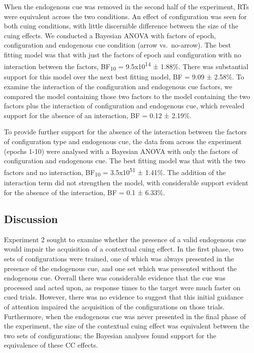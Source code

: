 \documentclass[
  man,floatsintext]{apa7}
\begin{document}
When the endogenous cue was removed in the second half of the experiment, RTs were equivalent across the two conditions. An effect of configuration was seen for both cuing conditions, with little discernible difference between the size of the cuing effects. We conducted a Bayesian ANOVA with factors of epoch, configuration and endogenous cue condition (arrow vs.~no-arrow). The best fitting model was that with just the factors of epoch and configuration with no interaction between the factors, BF\textsubscript{10} = 9.5x10\textsuperscript{14} ± 1.88\%. There was substantial support for this model over the next best fitting model, BF = 9.09 ± 2.58\%. To examine the interaction of the configuration and endogenous cue factors, we compared the model containing those two factors to the model containing the two factors plus the interaction of configuration and endogenous cue, which revealed support for the absence of an interaction, BF = 0.12 ± 2.19\%.

To provide further support for the absence of the interaction between the factors of configuration type and endogenous cue, the data from across the experiment (epochs 1-10) were analysed with a Bayesian ANOVA with only the factors of configuration and endogenous cue. The best fitting model was that with the two factors and no interaction, BF\textsubscript{10} = 3.5x10\textsuperscript{51} ± 1.41\%. The addition of the interaction term did not strengthen the model, with considerable support evident for the absence of the interaction, BF = 0.1 ± 6.33\%.

\hypertarget{discussion-1}{%
\subsection{Discussion}\label{discussion-1}}

Experiment 2 sought to examine whether the presence of a valid endogenous cue would impair the acquisition of a contextual cuing effect. In the first phase, two sets of configurations were trained, one of which was always presented in the presence of the endogenous cue, and one set which was presented without the endogenous cue. Overall there was considerable evidence that the cue was processed and acted upon, as response times to the target were much faster on cued trials. However, there was no evidence to suggest that this initial guidance of attention impaired the acquisition of the configurations on those trials. Furthermore, when the endogenous cue was never presented in the final phase of the experiment, the size of the contextual cuing effect was equivalent between the two sets of configurations; the Bayesian analyses found support for the equivalence of these CC effects.
\end{document}
